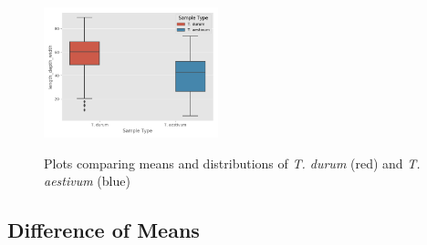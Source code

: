 \documentclass[11pt]{report}
\begin{document}
\begin{figure}[!ht]
{    \includegraphics[width=0.45\textwidth]{./images/results/group7/length_depth_width.png}
    }
  \caption{Plots comparing means and distributions of \textit{T. durum} (red) and \textit{T. aestivum} (blue)}
  \label{fig:dummy}
\end{figure}
\clearpage
\subsection{Difference of Means}
\label{sec:org696d380}
\end{document}
